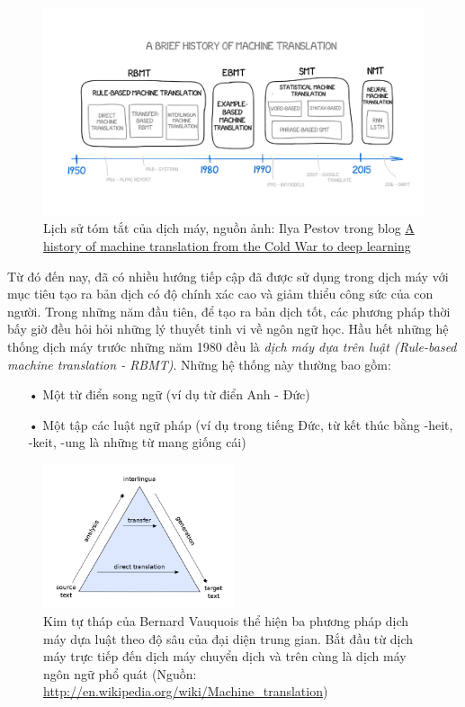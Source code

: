 \begin{figure}
	\centering
	\includegraphics[width=\textwidth]{mthistory}
	\caption[Lịch sử tóm tắt của dịch máy]{Lịch sử tóm tắt của dịch máy, nguồn ảnh: Ilya Pestov trong blog \href{https://medium.freecodecamp.org/a-history-of-machine-translation-from-the-cold-war-to-deep-learning-f1d335ce8b5}{A history of machine translation from the Cold War to deep learning}}
	\label{fig_mthistory}
\end{figure}

Từ đó đến nay, đã có nhiều hướng tiếp cập đã được sử dụng trong dịch máy với mục tiêu tạo ra bản dịch có độ chính xác cao và giảm thiểu công sức của con người. Trong những năm đầu tiên, để tạo ra bản dịch tốt, các phương pháp thời bấy giờ đều hỏi hỏi những lý thuyết tinh vi về ngôn ngữ học. Hầu hết những hệ thống dịch máy trước những năm 1980 đều là \textit{dịch máy dựa trên luật (Rule-based machine translation - RBMT)}. Những hệ thống này thường bao gồm:
\begin{itemize}
	\item[•] Một từ điển song ngữ (ví dụ từ điển Anh - Đức)
	\item[•] Một tập các luật ngữ pháp (ví dụ trong tiếng Đức, từ kết thúc bằng -heit, -keit, -ung là những từ mang giống cái)		
\end{itemize} 

\begin{figure}
	\centering
	\includegraphics[width=0.5\textwidth]{rulebasedpyramid}
	\caption[Ba phương pháp dịch máy dựa trên luật]{Kim tự tháp của Bernard Vauquois thể hiện ba phương pháp dịch máy dựa luật theo độ sâu của đại diện trung gian. Bắt đầu từ dịch máy trực tiếp đến dịch máy chuyển dịch và trên cùng là dịch máy ngôn ngữ phổ quát (Nguồn: \href{http://en.wikipedia.org/wiki/Machine_translation}{http://en.wikipedia.org/wiki/Machine\_translation})}
	\label{fig_rulebasedpyramid}
\end{figure}

